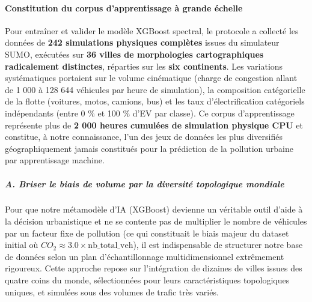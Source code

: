 \documentclass[10pt, a4paper]{article}
\begin{document}
\paragraph{Constitution du corpus d'apprentissage à grande
échelle}\label{constitution-du-corpus-dapprentissage-uxe0-grande-uxe9chelle}

Pour entraîner et valider le modèle XGBoost spectral, le protocole a
collecté les données de \textbf{242 simulations physiques complètes}
issues du simulateur SUMO, exécutées sur \textbf{36 villes de
morphologies cartographiques radicalement distinctes}, réparties sur les
\textbf{six continents}. Les variations systématiques portaient sur le
volume cinématique (charge de congestion allant de 1 000 à 128 644
véhicules par heure de simulation), la composition catégorielle de la
flotte (voitures, motos, camions, bus) et les taux d'électrification
catégoriels indépendants (entre 0 \% et 100 \% d'EV par classe). Ce
corpus d'apprentissage représente plus de \textbf{2 000 heures cumulées
de simulation physique CPU} et constitue, à notre connaissance, l'un des
jeux de données les plus diversifiés géographiquement jamais constitués
pour la prédiction de la pollution urbaine par apprentissage machine.

\subparagraph{A. Briser le biais de volume par la diversité topologique
mondiale}\label{a.-briser-le-biais-de-volume-par-la-diversituxe9-topologique-mondiale}

Pour que notre métamodèle d'IA (XGBoost) devienne un véritable outil
d'aide à la décision urbanistique et ne se contente pas de multiplier le
nombre de véhicules par un facteur fixe de pollution (ce qui constituait
le biais majeur du dataset initial où
\(CO_2 \approx 3.0 \times \text{nb\_total\_veh}\)), il est indispensable
de structurer notre base de données selon un plan d'échantillonnage
multidimensionnel extrêmement rigoureux. Cette approche repose sur
l'intégration de dizaines de villes issues des quatre coins du monde,
sélectionnées pour leurs caractéristiques topologiques uniques, et
simulées sous des volumes de trafic très variés.
\end{document}
